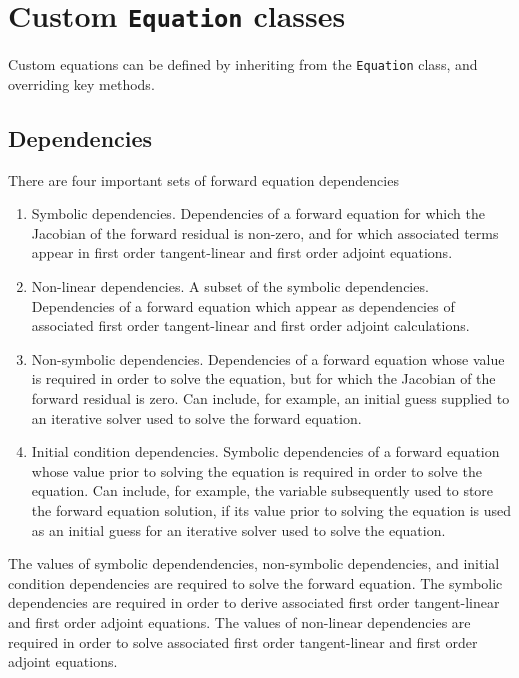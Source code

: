 \documentclass[11pt]{article}
\begin{document}
\section{Custom \texttt{Equation} classes}\label{sect:custom}

Custom equations can be defined by inheriting from the \texttt{Equation} class,
and overriding key methods.

\subsection{Dependencies}

There are four important sets of forward equation dependencies
\begin{enumerate}
  \item Symbolic dependencies. Dependencies of a forward equation for which the
    Jacobian of the forward residual is non-zero, and for which associated
    terms appear in first order tangent-linear and first order adjoint
    equations.
  \item Non-linear dependencies. A subset of the symbolic dependencies.
    Dependencies of a forward equation which appear as dependencies of
    associated first order tangent-linear and first order adjoint calculations.
  \item Non-symbolic dependencies. Dependencies of a forward equation whose
    value is required in order to solve the equation, but for which the
    Jacobian of the forward residual is zero. Can include, for example, an
    initial guess supplied to an iterative solver used to solve the forward
    equation.
  \item Initial condition dependencies. Symbolic dependencies of a forward
    equation whose value prior to solving the equation is required in order to
    solve the equation. Can include, for example, the variable subsequently
    used to store the forward equation solution, if its value prior to solving
    the equation is used as an initial guess for an iterative solver used to
    solve the equation.
\end{enumerate}
The values of symbolic dependendencies, non-symbolic dependencies, and initial
condition dependencies are required to solve the forward equation. The symbolic
dependencies are required in order to derive associated first order
tangent-linear and first order adjoint equations. The values of non-linear
dependencies are required in order to solve associated first order
tangent-linear and first order adjoint equations.
\end{document}
